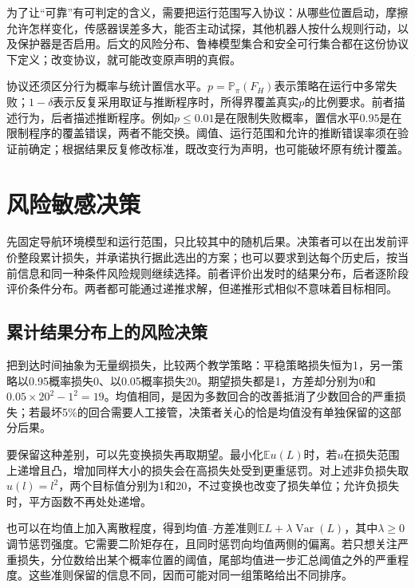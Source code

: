 为了让“可靠”有可判定的含义，需要把运行范围写入协议：从哪些位置启动，摩擦允许怎样变化，传感器误差多大，能否主动试探，其他机器人按什么规则行动，以及保护器是否启用。后文的风险分布、鲁棒模型集合和安全可行集合都在这份协议下定义；改变协议，就可能改变原声明的真假。

协议还须区分行为概率与统计置信水平。$p=\mathbb P_\pi(F_H)$表示策略在运行中多常失败；$1-\delta$表示反复采用取证与推断程序时，所得界覆盖真实$p$的比例要求。前者描述行为，后者描述推断程序。例如$p\leq0.01$是在限制失败概率，置信水平$0.95$是在限制程序的覆盖错误，两者不能交换。阈值、运行范围和允许的推断错误率须在验证前确定；根据结果反复修改标准，既改变行为声明，也可能破坏原有统计覆盖。

\section{风险敏感决策}
\label{sec:rl-trustworthy-risk}

先固定导航环境模型和运行范围，只比较其中的随机后果。决策者可以在出发前评价整段累计损失，并承诺执行据此选出的方案；也可以要求到达每个历史后，按当前信息和同一种条件风险规则继续选择。前者评价出发时的结果分布，后者逐阶段评价条件分布。两者都可能通过递推求解，但递推形式相似不意味着目标相同。

\subsection{累计结果分布上的风险决策}
\label{sec:rl-trustworthy-static-risk}

把到达时间抽象为无量纲损失，比较两个教学策略：平稳策略损失恒为1，另一策略以0.95概率损失0、以0.05概率损失20。期望损失都是1，方差却分别为0和$0.05\times20^2-1^2=19$。均值相同，是因为多数回合的改善抵消了少数回合的严重损失；若最坏5\%的回合需要人工接管，决策者关心的恰是均值没有单独保留的这部分后果。

要保留这种差别，可以先变换损失再取期望。最小化$\mathbb E u(L)$时，若$u$在损失范围上递增且凸，增加同样大小的损失会在高损失处受到更重惩罚。对上述非负损失取$u(l)=l^2$，两个目标值分别为1和20，不过变换也改变了损失单位；允许负损失时，平方函数不再处处递增。

也可以在均值上加入离散程度，得到均值--方差准则$\mathbb E L+\lambda\operatorname{Var}(L)$，其中$\lambda\geq0$调节惩罚强度。它需要二阶矩存在，且同时惩罚向均值两侧的偏离。若只想关注严重损失，分位数给出某个概率位置的阈值，尾部均值进一步汇总阈值之外的严重程度。这些准则保留的信息不同，因而可能对同一组策略给出不同排序。

